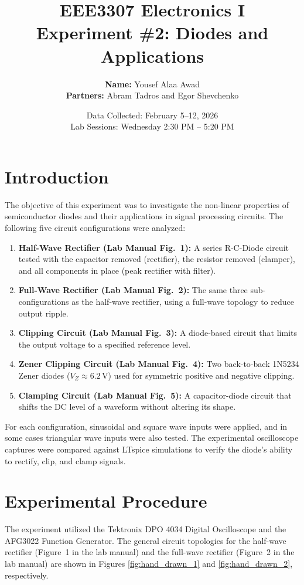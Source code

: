 \documentclass[12pt, letterpaper]{article}
\title{
    \vspace{1in}
    \textbf{\huge EEE3307 Electronics I} \\[0.5em]
    \textbf{\Large Experiment \#2: Diodes and Applications}
    \vspace{1.5in}
}
\author{
    \textbf{Name:} Yousef Alaa Awad \\
    \textbf{Partners:} Abram Tadros and Egor Shevchenko \\
}
\date{Data Collected: February 5--12, 2026 \\ Lab Sessions: Wednesday 2:30 PM -- 5:20 PM}
\begin{document}
\maketitle
\newpage

\section{Introduction}
The objective of this experiment was to investigate the non-linear properties of semiconductor diodes and their applications in signal processing circuits. The following five circuit configurations were analyzed:
\begin{enumerate}
	\item \textbf{Half-Wave Rectifier (Lab Manual Fig.~1):} A series R-C-Diode circuit tested with the capacitor removed (rectifier), the resistor removed (clamper), and all components in place (peak rectifier with filter).
	\item \textbf{Full-Wave Rectifier (Lab Manual Fig.~2):} The same three sub-configurations as the half-wave rectifier, using a full-wave topology to reduce output ripple.
	\item \textbf{Clipping Circuit (Lab Manual Fig.~3):} A diode-based circuit that limits the output voltage to a specified reference level.
	\item \textbf{Zener Clipping Circuit (Lab Manual Fig.~4):} Two back-to-back 1N5234 Zener diodes ($V_Z \approx 6.2\,\text{V}$) used for symmetric positive and negative clipping.
	\item \textbf{Clamping Circuit (Lab Manual Fig.~5):} A capacitor-diode circuit that shifts the DC level of a waveform without altering its shape.
\end{enumerate}
For each configuration, sinusoidal and square wave inputs were applied, and in some cases triangular wave inputs were also tested. The experimental oscilloscope captures were compared against LTspice simulations to verify the diode's ability to rectify, clip, and clamp signals.

\pagebreak
\section{Experimental Procedure}
The experiment utilized the Tektronix DPO 4034 Digital Oscilloscope and the AFG3022 Function Generator. The general circuit topologies for the half-wave rectifier (Figure~1 in the lab manual) and the full-wave rectifier (Figure~2 in the lab manual) are shown in Figures \ref{fig:hand_drawn_1} and \ref{fig:hand_drawn_2}, respectively.
\end{document}
